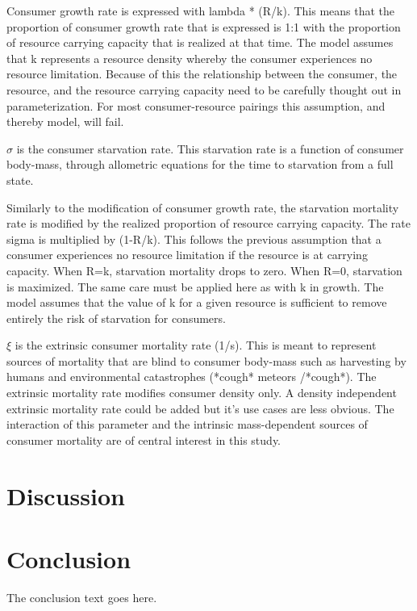 \documentclass[]{rsos}%
\begin{document}
Consumer growth rate is expressed with lambda * (R/k). This means that the proportion of consumer growth rate that is expressed is 1:1 with the proportion of resource carrying capacity that is realized at that time. The model assumes that k represents a resource density whereby the consumer experiences no resource limitation. Because of this the relationship between the consumer, the resource, and the resource carrying capacity need to be carefully thought out in parameterization. For most consumer-resource pairings this assumption, and thereby model, will fail. 


$\sigma$ is the consumer starvation rate. This starvation rate is a function of consumer body-mass, through allometric equations for the time to starvation from a full state. 

Similarly to the modification of consumer growth rate, the starvation mortality rate is modified by the realized proportion of resource carrying capacity. The rate sigma is multiplied by (1-R/k). This follows the previous assumption that a consumer experiences no resource limitation if the resource is at carrying capacity. When R=k, starvation mortality drops to zero. When R=0, starvation is maximized.  The same care must be applied here as with k in growth. The model assumes that the value of k for a given resource is sufficient to remove entirely the risk of starvation for consumers.

$\xi$ is the extrinsic consumer mortality rate (1/s). This is meant to represent sources of mortality that are blind to consumer body-mass such as harvesting by humans and environmental catastrophes (*cough* meteors /*cough*). The extrinsic mortality rate modifies consumer density only. A density independent extrinsic mortality rate could be added but it’s use cases are less obvious. The interaction of this parameter and the intrinsic mass-dependent sources of consumer mortality are of central interest in this study.  

\section{Discussion}


\section{Conclusion}
The conclusion text goes here.

\vskip1pc

\end{document}
